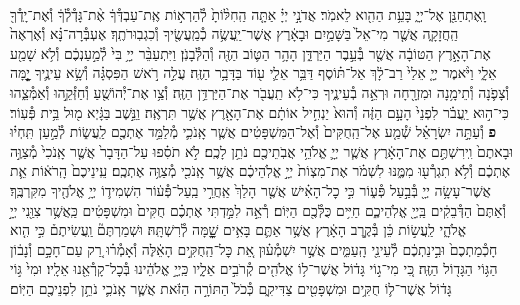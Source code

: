 \documentclass[twoside, openany, parskip=half, 11pt]{book}
\begin{document}
\begin{footnotesize}
\begin{multicols}{2}
\\
וָֽאֶתְחַנַּ֖ן אֶל־יְיָ֑ בָּעֵ֥ת הַהִ֖וא לֵאמֹֽר׃ אֲדֹנָ֣י יְיָ֗ אַתָּ֤ה הַֽחִלּ֨וֹתָ֙ לְ֯הַרְא֣וֹת אֶֽת־עַבְדְּ֯ךָ֔ אֶ֨ת־גָּדְ֯לְ֯ךָ֔ וְ֯אֶת־יָֽדְ֯ךָ֖ הַֽחֲזָקָ֑ה אֲשֶׁ֤ר מִי־אֵל֙ בַּשָּׁמַ֣יִם וּבָאָ֔רֶץ אֲשֶׁר־יַֽעֲשֶׂ֥ה כְ֯מַֽעֲשֶׂ֖יךָ וְ֯כִגְבֽוּרֹתֶֽךָ׃ אֶעְבְּ֯רָה־נָּ֗א וְ֯אֶרְאֶה֙ אֶת־הָאָ֣רֶץ הַטּוֹבָ֔ה אֲשֶׁ֖ר בְּ֯עֵ֣בֶר הַיַּרְדֵּ֑ן הָהָ֥ר הַטּ֛וֹב הַזֶּ֖ה וְ֯הַלְּ֯בָנֹֽן׃  וַיִּתְעַבֵּ֨ר יְיָ֥ בִּי֙ לְ֯מַ֣עַנְכֶ֔ם וְ֯לֹ֥א שָׁמַ֖ע אֵלָ֑י וַיֹּ֨אמֶר יְיָ֤ אֵלַי֙ רַב־לָ֔ךְ אַל־תּ֗וֹסֶף דַּבֵּ֥ר אֵלַ֛י ע֖וֹד בַּדָּבָ֥ר הַזֶּֽה׃ עֲלֵ֣ה רֹ֣אשׁ הַפִּסְגָּ֗ה וְ֯שָׂ֥א עֵינֶ֛יךָ יׇׇׇׇׇׇ֧מָּה וְ֯צָפֹ֛נָה וְ֯תֵימָ֥נָה וּמִזְרָ֖חָה וּרְאֵ֣ה בְ֯עֵינֶ֑יךָ כִּי־לֹ֥א תַֽעֲבֹ֖ר אֶת־הַיַּרְדֵּ֥ן הַזֶּֽה׃ וְ֯צַ֥ו אֶת־יְ֯הוֹשֻׁ֖עַ וְ֯חַזְּ֯קֵ֣הוּ וְ֯אַמְּ֯צֵ֑הוּ כִּי־ה֣וּא יַֽעֲבֹ֗ר לִפְנֵי֙ הָעָ֣ם הַזֶּ֔ה וְ֯הוּא֙ יַנְחִ֣יל אוֹתָ֔ם אֶת־הָאָ֖רֶץ אֲשֶׁ֥ר תִּרְאֶֽה׃ וַנֵּ֣שֶׁב בַּגָּ֔יְא מ֖וּל בֵּ֥ית פְּ֯עֽוֹר׃ \textbf{פ}
וְ֯עַתָּ֣ה יִשְׂרָאֵ֗ל שְׁ֯מַ֤ע אֶל־הַֽחֻקִּים֙ וְ֯אֶל־הַמִּשְׁפָּטִ֔ים אֲשֶׁ֧ר אָֽנֹכִ֛י מְ֯לַמֵּ֥ד אֶתְכֶ֖ם לַֽעֲשׂ֑וֹת לְ֯מַ֣עַן תִּֽחְי֗וּ וּבָאתֶם֙ וִֽירִשְׁתֶּ֣ם אֶת־הָאָ֔רֶץ אֲשֶׁ֧ר יְיָ֛ אֱלֹהֵ֥י אֲבֹֽתֵיכֶ֖ם נֹתֵ֥ן לָכֶֽם׃ לֹ֣א תֹסִ֗פוּ עַל־הַדָּבָר֙ אֲשֶׁ֤ר אָֽנֹכִי֙ מְ֯צַוֶּ֣ה אֶתְכֶ֔ם וְ֯לֹ֥א תִגְרְ֯ע֖וּ מִמֶּ֑נּוּ לִשְׁמֹ֗ר אֶת־מִצְוֹת֙ יְיָ֣ אֱלֹֽהֵיכֶ֔ם אֲשֶׁ֥ר אָֽנֹכִ֖י מְ֯צַוֶּ֥ה אֶתְכֶֽם׃ עֵֽינֵיכֶם֙ הָֽרֹא֔וֹת אֵ֛ת אֲשֶׁר־עָשָׂ֥ה יְיָ֖ בְּ֯בַ֣עַל פְּ֯ע֑וֹר כִּ֣י כׇל־הָאִ֗ישׁ אֲשֶׁ֤ר הָלַךְ֙ אַֽחֲרֵ֣י בַֽעַל־פְּ֯ע֔וֹר הִשְׁמִיד֛וֹ יְיָ֥ אֱלֹהֶ֖יךָ מִקִּרְבֶּֽךָ׃ וְ֯אַתֶּם֙ הַדְּ֯בֵקִ֔ים בַּֽיְיָ֖ אֱלֹֽהֵיכֶ֑ם חַיִּ֥ים כֻּלְּ֯כֶ֖ם הַיּֽוֹם׃  רְ֯אֵ֣ה לִמַּ֣דְתִּי אֶתְכֶ֗ם חֻקִּים֙ וּמִשְׁפָּטִ֔ים כַּֽאֲשֶׁ֥ר צִוַּ֖נִי יְיָ֣ אֱלֹהָ֑י לַֽעֲשׂ֣וֹת כֵּ֔ן בְּ֯קֶ֣רֶב הָאָ֔רֶץ אֲשֶׁ֥ר אַתֶּ֛ם בָּאִ֥ים שׇׇׇׇׇׇׁ֖מָּה לְ֯רִשְׁתָּֽהּ׃ וּשְׁמַרְתֶּם֘ וַֽעֲשִׂיתֶם֒ כִּ֣י הִ֤וא חָכְ֯מַתְכֶם֙ וּבִ֣ינַתְכֶ֔ם לְ֯עֵינֵ֖י הָֽעַמִּ֑ים אֲשֶׁ֣ר יִשְׁמְ֯ע֗וּן אֵ֚ת כׇּל־הַֽחֻקִּ֣ים הָאֵ֔לֶּה וְ֯אָמְ֯ר֗וּ רַ֚ק עַם־חָכָ֣ם וְ֯נָב֔וֹן הַגּ֥וֹי הַגָּד֖וֹל הַזֶּֽה׃ כִּ֚י מִי־ג֣וֹי גָּד֔וֹל אֲשֶׁר־ל֥וֹ אֱלֹהִ֖ים קְ֯רֹבִ֣ים אֵלָ֑יו כַּֽיְיָ֣ אֱלֹהֵ֔ינוּ בְּ֯כׇל־קָרְ֯אֵ֖נוּ אֵלָֽיו׃ וּמִי֙ גּ֣וֹי גָּד֔וֹל אֲשֶׁר־ל֛וֹ חֻקִּ֥ים וּמִשְׁפָּטִ֖ים צַדִּיקִ֑ם כְּ֯כֹל֙ הַתּוֹרָ֣ה הַזֹּ֔את אֲשֶׁ֧ר אָֽנֹכִ֛י נֹתֵ֥ן לִפְנֵיכֶ֖ם הַיּֽוֹם׃


\end{multicols}
\end{footnotesize}
\end{document}
